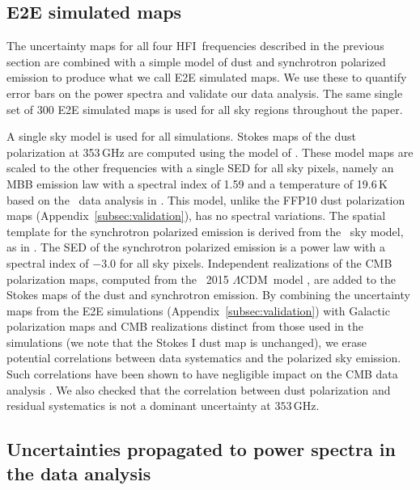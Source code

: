 \documentclass[longauth,traditabstract]{aa}
\def\LCDM{$\Lambda$CDM}
\newcommand{\HFI}{HFI}
\begin{document}
\subsection{E2E simulated maps}
\label{appendix:data_simulations}

The uncertainty maps for all four \HFI\ frequencies described in the previous section are combined with a simple model of dust and synchrotron polarized emission to produce what we call
E2E simulated maps.  We use these to quantify error bars on the power spectra and validate our data analysis. The same single set of 300 E2E simulated maps is used for all sky regions throughout the paper. 

A single sky model is used for all simulations. Stokes maps of the dust polarization at 353\,GHz are computed using the model of \citet{Vansyngel16}. These model maps are 
scaled to the other frequencies with a single SED for all sky pixels, namely an MBB emission law with a spectral index of 1.59 and a temperature of 19.6\,K based on the \Planck\ 
data analysis in \citet{planck2013-XVII,planck2014-XXII}. This model, unlike the FFP10 dust polarization maps (Appendix~\ref{subsec:validation}), has no spectral variations.
%
The spatial template for the synchrotron polarized emission is derived from the \Planck\ sky model, as in \citet{planck2014-a14}. 
The SED of the synchrotron polarized emission is a power law with a spectral index of $-3.0$ for all sky pixels. Independent realizations of the CMB polarization maps, computed
from the \Planck\ 2015 \LCDM\ model \citep{planck2014-a15}, are added to the Stokes maps of the dust and synchrotron emission. 
%
By combining the uncertainty maps from
the E2E simulations (Appendix~\ref{subsec:validation}) with Galactic polarization maps
and CMB realizations distinct from those used in the simulations (we note that the Stokes I dust map is unchanged), 
we erase potential correlations between data systematics and the 
polarized sky emission. Such correlations have been shown to have negligible impact on the CMB data analysis \citep{planck2014-a10,planck2016-l03}. We also checked 
that the correlation between dust polarization and residual systematics is not a dominant uncertainty at $353\,$GHz. 

\subsection{Uncertainties propagated to power spectra in the data analysis}
\label{appendix:uncertainties_power_spectra}
\end{document}

